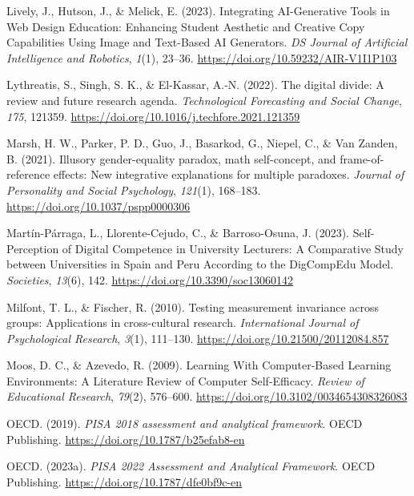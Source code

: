 \documentclass[
  letterpaper,
  DIV=11,
  numbers=noendperiod]{scrartcl}
\newlength{\cslhangindent}
\newenvironment{CSLReferences}[2] %
 {\begin{list}{}{%
  \setlength{\itemindent}{0pt}
  \setlength{\leftmargin}{0pt}
  \setlength{\parsep}{0pt}
  \ifodd #1
   \setlength{\leftmargin}{\cslhangindent}
   \setlength{\itemindent}{-1\cslhangindent}
  \fi
  \setlength{\itemsep}{#2\baselineskip}}}
 {\end{list}}
\begin{document}
\begin{CSLReferences}{1}{0}
Lively, J., Hutson, J., \& Melick, E. (2023). Integrating {AI-Generative
Tools} in {Web Design Education}: {Enhancing Student Aesthetic} and
{Creative Copy Capabilities Using Image} and {Text-Based AI Generators}.
\emph{DS Journal of Artificial Intelligence and Robotics}, \emph{1}(1),
23--36. \url{https://doi.org/10.59232/AIR-V1I1P103}

Lythreatis, S., Singh, S. K., \& El-Kassar, A.-N. (2022). The digital
divide: {A} review and future research agenda. \emph{Technological
Forecasting and Social Change}, \emph{175}, 121359.
\url{https://doi.org/10.1016/j.techfore.2021.121359}

Marsh, H. W., Parker, P. D., Guo, J., Basarkod, G., Niepel, C., \& Van
Zanden, B. (2021). Illusory gender-equality paradox, math self-concept,
and frame-of-reference effects: {New} integrative explanations for
multiple paradoxes. \emph{Journal of Personality and Social Psychology},
\emph{121}(1), 168--183. \url{https://doi.org/10.1037/pspp0000306}

Martín-Párraga, L., Llorente-Cejudo, C., \& Barroso-Osuna, J. (2023).
Self-{Perception} of {Digital Competence} in {University Lecturers}: {A
Comparative Study} between {Universities} in {Spain} and {Peru
According} to the {DigCompEdu Model}. \emph{Societies}, \emph{13}(6),
142. \url{https://doi.org/10.3390/soc13060142}

Milfont, T. L., \& Fischer, R. (2010). Testing measurement invariance
across groups: Applications in cross-cultural research.
\emph{International Journal of Psychological Research}, \emph{3}(1),
111--130. \url{https://doi.org/10.21500/20112084.857}

Moos, D. C., \& Azevedo, R. (2009). Learning {With Computer-Based
Learning Environments}: {A Literature Review} of {Computer
Self-Efficacy}. \emph{Review of Educational Research}, \emph{79}(2),
576--600. \url{https://doi.org/10.3102/0034654308326083}

OECD. (2019). \emph{{PISA} 2018 assessment and analytical framework}.
OECD Publishing. \url{https://doi.org/10.1787/b25efab8-en}

OECD. (2023a). \emph{{PISA} 2022 {Assessment} and {Analytical
Framework}}. OECD Publishing. \url{https://doi.org/10.1787/dfe0bf9c-en}


\end{CSLReferences}
\end{document}
